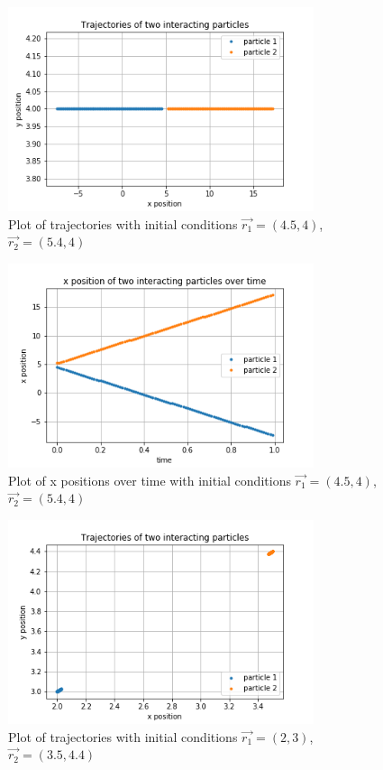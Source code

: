 \documentclass{article}
\begin{document}
\begin{figure}[H]
	\centering
	\includegraphics[width=0.8\textwidth]{../images/q2_ii_traj.png}
	\caption{Plot of trajectories with initial conditions $\vec{r_1}=(4.5,4)$, $\vec{r_2}=(5.4,4)$}
	\label{fig:q2_ii_traj}
\end{figure}

\begin{figure}[H]
	\centering
	\includegraphics[width=0.8\textwidth]{../images/q2_ii_xpos.png}
	\caption{Plot of x positions over time with initial conditions $\vec{r_1}=(4.5,4)$, $\vec{r_2}=(5.4,4)$}
	\label{fig:q2_ii_xpos}
\end{figure}

\begin{figure}[H]
	\centering
	\includegraphics[width=0.8\textwidth]{../images/q2_iii_traj.png}
	\caption{Plot of trajectories with initial conditions $\vec{r_1}=(2,3)$, $\vec{r_2}=(3.5,4.4)$}
	\label{fig:q2_iii_traj}
\end{figure}
\end{document}
